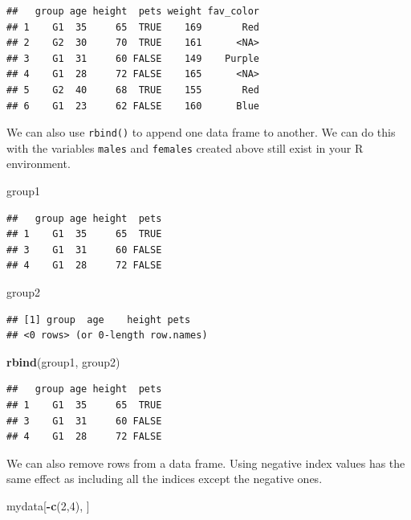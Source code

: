\documentclass[
]{book}
\newenvironment{Shaded}{\begin{snugshade}}{\end{snugshade}}
\newcommand{\DecValTok}[1]{\textcolor[rgb]{0.00,0.00,0.81}{#1}}
\newcommand{\KeywordTok}[1]{\textcolor[rgb]{0.13,0.29,0.53}{\textbf{#1}}}
\newcommand{\NormalTok}[1]{#1}
\newcommand{\OperatorTok}[1]{\textcolor[rgb]{0.81,0.36,0.00}{\textbf{#1}}}
\begin{document}
\begin{verbatim}
##   group age height  pets weight fav_color
## 1    G1  35     65  TRUE    169       Red
## 2    G2  30     70  TRUE    161      <NA>
## 3    G1  31     60 FALSE    149    Purple
## 4    G1  28     72 FALSE    165      <NA>
## 5    G2  40     68  TRUE    155       Red
## 6    G1  23     62 FALSE    160      Blue
\end{verbatim}

We can also use \texttt{rbind()} to append one data frame to another. We can do this with the variables \texttt{males} and \texttt{females} created above still exist in your R environment.

\begin{Shaded}
\begin{Highlighting}[]
\NormalTok{group1}
\end{Highlighting}
\end{Shaded}

\begin{verbatim}
##   group age height  pets
## 1    G1  35     65  TRUE
## 3    G1  31     60 FALSE
## 4    G1  28     72 FALSE
\end{verbatim}

\begin{Shaded}
\begin{Highlighting}[]
\NormalTok{group2}
\end{Highlighting}
\end{Shaded}

\begin{verbatim}
## [1] group  age    height pets  
## <0 rows> (or 0-length row.names)
\end{verbatim}

\begin{Shaded}
\begin{Highlighting}[]
\KeywordTok{rbind}\NormalTok{(group1, group2)}
\end{Highlighting}
\end{Shaded}

\begin{verbatim}
##   group age height  pets
## 1    G1  35     65  TRUE
## 3    G1  31     60 FALSE
## 4    G1  28     72 FALSE
\end{verbatim}

We can also remove rows from a data frame. Using negative index values has the same effect as including all the indices except the negative ones.

\begin{Shaded}
\begin{Highlighting}[]
\NormalTok{mydata[}\OperatorTok{-}\KeywordTok{c}\NormalTok{(}\DecValTok{2}\NormalTok{,}\DecValTok{4}\NormalTok{), ]}
\end{Highlighting}
\end{Shaded}
\end{document}

